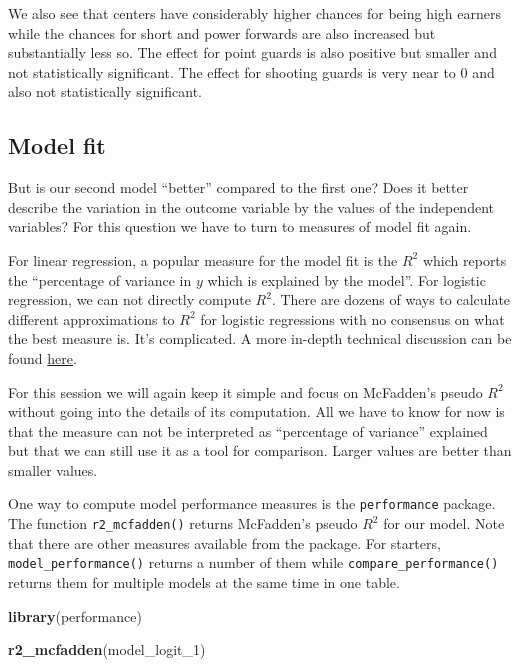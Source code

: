 \documentclass[
]{book}
\newenvironment{Shaded}{\begin{snugshade}}{\end{snugshade}}
\newcommand{\FunctionTok}[1]{\textcolor[rgb]{0.13,0.29,0.53}{\textbf{#1}}}
\newcommand{\NormalTok}[1]{#1}
\begin{document}
We also see that centers have considerably higher chances for being high earners
while the chances for short and power forwards are also increased but
substantially less so. The effect for point guards is also positive but
smaller and not statistically significant. The effect for shooting
guards is very near to \(0\) and also not statistically significant.

\hypertarget{model-fit-1}{%
\subsection{Model fit}\label{model-fit-1}}

But is our second model ``better'' compared to the first one? Does it
better describe the variation in the outcome variable by the values of
the independent variables? For this question we have to turn to measures
of model fit again.

For linear regression, a popular measure for the model fit is the \(R^2\)
which reports the ``percentage of variance in \(y\) which is explained by
the model''. For logistic regression, we can not directly compute \(R^2\).
There are dozens of ways to calculate different approximations to \(R^2\)
for logistic regressions with no consensus on what the best measure is.
It's complicated. A more in-depth technical discussion can be found
\href{https://www.youtube.com/watch?v=xxFYro8QuXA\&ab_channel=StatQuestwithJoshStarmer}{here}.

For this session we will again keep it simple and focus on McFadden's pseudo
\(R^2\) without going into the details of its computation. All we have to know
for now is that the measure can not be interpreted as ``percentage of
variance'' explained but that we can still use it as a tool for comparison.
Larger values are better than smaller values.

One way to compute model performance measures is the \texttt{performance}
package. The function \texttt{r2\_mcfadden()} returns McFadden's pseudo \(R^2\)
for our model. Note that there are other measures available from the
package. For starters, \texttt{model\_performance()} returns a number of them
while \texttt{compare\_performance()} returns them for multiple models at the
same time in one table.

\begin{Shaded}
\begin{Highlighting}[]
\FunctionTok{library}\NormalTok{(performance)}

\FunctionTok{r2\_mcfadden}\NormalTok{(model\_logit\_1)}
\end{Highlighting}
\end{Shaded}
\end{document}
